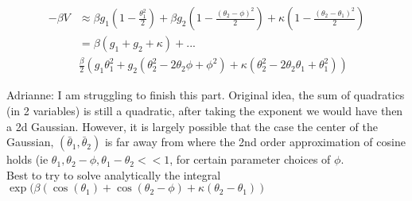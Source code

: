 \documentclass[%
 reprint,
 amsmath,amssymb,
 aps,
]{revtex4-2}
\begin{document}
\begin{align*}
  -\beta V &\approx \beta g_1 (1 - \frac{\theta_1^2}{2}) + \beta g_2 (1 - \frac{(\theta_2 - \phi)^2}{2}) + \kappa (1 - \frac{(\theta_2 - \theta_1)^2}{2}) \\
  &= \beta(g_1 + g_2 + \kappa) + ... \\
  &\frac{\beta }{2}(g_1 \theta_1^2 + g_2(\theta_2^2 - 2 \theta_2 \phi + \phi^2) + \kappa (\theta_2^2 - 2 \theta_2 \theta_1+  \theta_1^2))
\end{align*}

Adrianne: I am struggling to finish this part. Original idea, the sum of quadratics (in 2 variables) is still a quadratic, after taking the exponent we would have then a 2d Gaussian. However, it is largely possible that the case the center of the Gaussian, $(\bar{\theta}_1, \bar{\theta}_2)$ is far away from where the 2nd order approximation of cosine holds (ie $\theta_1, \theta_2 - \phi, \theta_1 - \theta_2 << 1$, for certain parameter choices of $\phi$.
\\
Best to try to solve analytically the integral $\exp(\beta(\cos(\theta_1) + \cos(\theta_2 - \phi) + \kappa(\theta_2 - \theta_1))$
\end{document}
